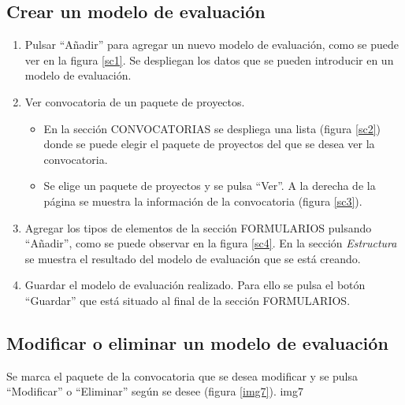 \documentclass[12pt,a4paper,spanish,twoside]{book}
\begin{document}
\subsection{Crear un modelo de evaluación}
\begin{enumerate}
\item Pulsar ``Añadir'' para agregar un nuevo modelo de evaluación, como se 
  puede ver en la figura \ref{sc1}. Se despliegan los datos que se pueden 
  introducir en un modelo de evaluación.
  

\item Ver convocatoria de un paquete de proyectos.
  \begin{itemize}
  \item En la sección CONVOCATORIAS se despliega una lista (figura \ref{sc2}) 
    donde se puede elegir el paquete de proyectos del que se desea ver la 
    convocatoria.


  \item Se elige un paquete de proyectos y se pulsa ``Ver''. A la derecha de la 
    página se muestra la información de la convocatoria (figura \ref{sc3}).

  \end{itemize}

\item Agregar los tipos de elementos de la sección FORMULARIOS pulsando 
  ``Añadir'', como se puede observar en la figura \ref{sc4}. En la sección 
  \emph{Estructura} se muestra el resultado del modelo de evaluación que se
  está creando.


\item Guardar el modelo de evaluación realizado. Para ello se pulsa el botón 
  ``Guardar'' que está situado al final de la sección FORMULARIOS.
\end{enumerate}

\subsection{Modificar o eliminar un modelo de evaluación}
Se marca el paquete de la convocatoria que se desea modificar y se pulsa 
``Modificar'' o ``Eliminar'' según se desee (figura \ref{img7}).
{img7}{}
\end{document}
